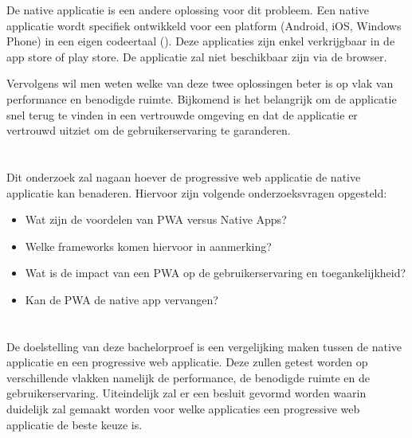 De native applicatie is een andere oplossing voor dit probleem. Een native applicatie wordt specifiek ontwikkeld voor een platform (Android, iOS, Windows Phone) in een eigen codeertaal (\cite{DIFF_NATIVEAPP_PWA}). Deze applicaties zijn enkel verkrijgbaar in de app store of play store. De applicatie zal niet beschikbaar zijn via de browser.

Vervolgens wil men weten welke van deze twee oplossingen beter is op vlak van performance en benodigde ruimte. Bijkomend is het belangrijk om de applicatie snel terug te vinden in een vertrouwde omgeving en dat de applicatie er vertrouwd uitziet om de gebruikerservaring te garanderen.


\section{}
\label{sec:onderzoeksvraag}

Dit onderzoek zal nagaan hoever de progressive web applicatie de native applicatie kan benaderen. 
Hiervoor zijn volgende onderzoeksvragen opgesteld:
\begin{itemize}
	\item Wat zijn de voordelen van PWA versus Native Apps?
	\item Welke frameworks komen hiervoor in aanmerking?
	\item  Wat is de impact van een PWA op de gebruikerservaring en toegankelijkheid?
	\item Kan de PWA de native app vervangen?
\end{itemize}

\section{}
\label{sec:onderzoeksdoelstelling}

De doelstelling van deze bachelorproef is een vergelijking maken tussen de native applicatie en een progressive web applicatie. Deze zullen getest worden op verschillende vlakken namelijk de performance, de benodigde ruimte en de gebruikerservaring. Uiteindelijk zal er een besluit gevormd worden waarin duidelijk zal gemaakt worden voor welke applicaties een progressive web applicatie de beste keuze is.

\section{}
\label{sec:opzet-bachelorproef}

